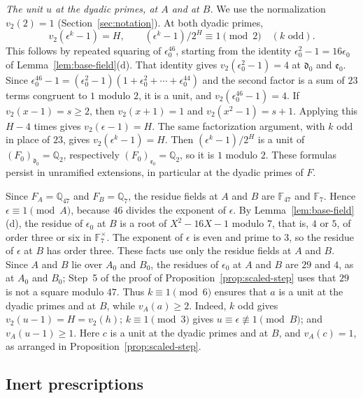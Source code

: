 \documentclass[11pt]{article}
\theoremstyle{plain}
\theoremstyle{definition}
\theoremstyle{remark}
\newcommand{\Q}{\mathbb Q}
\newcommand{\F}{\mathbb F}
\begin{document}
\emph{The unit $u$ at the dyadic primes, at $A$ and at $B$.}  We use the
normalization $v_2(2)=1$ (Section~\ref{sec:notation}).  At both dyadic
primes,
\begin{equation}\label{eq:dyadic-depth}
 v_2(\epsilon^k-1)=H,\qquad (\epsilon^k-1)/2^H\equiv1\pmod2
 \quad(k\text{ odd}).
\end{equation}
This follows by repeated squaring of $\epsilon_0^{46}$, starting from the
identity $\epsilon_0^2-1=16\epsilon_0$ of
Lemma~\ref{lem:base-field}(d).  That identity gives
$v_2(\epsilon_0^2-1)=4$ at $\mathfrak d_0$ and $\mathfrak e_0$.  Since
$\epsilon_0^{46}-1=(\epsilon_0^2-1)(1+\epsilon_0^2+\cdots+\epsilon_0^{44})$
and the second factor is a sum of $23$ terms congruent to $1$ modulo $2$,
it is a unit, and
$v_2(\epsilon_0^{46}-1)=4$.  If $v_2(x-1)=s\ge2$, then $v_2(x+1)=1$ and
$v_2(x^2-1)=s+1$.  Applying this $H-4$ times gives $v_2(\epsilon-1)=H$.
The same factorization argument, with $k$ odd in place of $23$, gives
$v_2(\epsilon^k-1)=H$.  Then $(\epsilon^k-1)/2^H$ is a unit of
$(F_0)_{\mathfrak d_0}=\Q_2$, respectively $(F_0)_{\mathfrak e_0}=\Q_2$,
so it is $1$ modulo $2$.  These formulas persist in unramified
extensions, in particular at the dyadic primes of $F$.

Since $F_A=\Q_{47}$ and $F_B=\Q_7$, the residue fields at $A$ and $B$
are $\F_{47}$ and $\F_7$.  Hence $\epsilon\equiv1\pmod A$, because $46$
divides the exponent of $\epsilon$.  By Lemma~\ref{lem:base-field}(d),
the residue of $\epsilon_0$ at $B$ is a root of $X^2-16X-1$ modulo $7$,
that is, $4$ or $5$, of order three or six in $\F_7^\times$.  The
exponent of $\epsilon$ is even and prime to $3$, so the residue of
$\epsilon$ at $B$ has order three.  These facts use only the residue
fields at $A$ and $B$.  Since $A$ and $B$ lie over $A_0$ and $B_0$, the
residues of $\epsilon_0$ at $A$ and $B$ are $29$ and $4$, as at $A_0$
and $B_0$; Step~5 of the proof of Proposition~\ref{prop:scaled-step}
uses that $29$ is not a square modulo $47$.  Thus
$k\equiv1\pmod6$ ensures that $a$ is a unit at the dyadic primes and at
$B$, while $v_A(a)\ge2$.  Indeed, $k$ odd gives $v_2(u-1)=H=v_2(h)$;
$k\equiv1\pmod3$ gives $u\equiv\epsilon\not\equiv1\pmod B$; and
$v_A(u-1)\ge1$.  Here $c$ is a unit at the dyadic primes and at $B$, and
$v_A(c)=1$, as arranged in Proposition~\ref{prop:scaled-step}.

\subsection{Inert prescriptions}\label{sec:inert-prescriptions}
\end{document}
